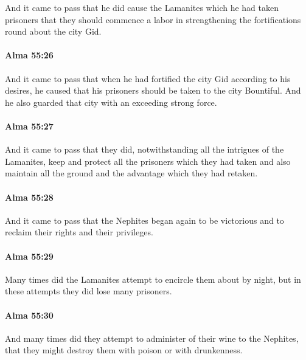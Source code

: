 			And it came to pass that
			he did cause the Lamanites which he had taken prisoners
			that they should commence a labor
			in strengthening the fortifications round about the city Gid.

		\paragraph{Alma 55:26} %
			\label{ALMA-55-26}

			And it came to pass that
			when he had fortified the city Gid according to his desires,
			he caused that his prisoners should be taken to the city Bountiful.
			And he also guarded that city with an exceeding strong force.

		\paragraph{Alma 55:27} %
			\label{ALMA-55-27}

			And it came to pass that they did,
			notwithstanding all the intrigues of the Lamanites,
			keep and protect all the prisoners which they had taken
			and also maintain all the ground and the advantage which they had retaken.

		\paragraph{Alma 55:28} %
			\label{ALMA-55-28}

			And it came to pass that the Nephites began again to be victorious
			and to reclaim their rights and their privileges.

		\paragraph{Alma 55:29} %
			\label{ALMA-55-29}

			Many times did the Lamanites attempt to encircle them about by night,
			but in these attempts they did lose many prisoners.

		\paragraph{Alma 55:30} %
			\label{ALMA-55-30}

			And many times did they attempt to administer of their wine to the Nephites,
			that they might destroy them with poison or with drunkenness.


